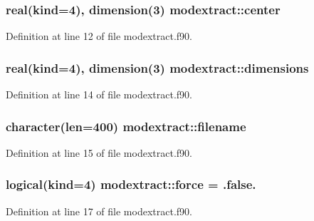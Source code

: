 \subsubsection[{\texorpdfstring{center}{center}}]{\setlength{\rightskip}{0pt plus 5cm}real(kind=4), dimension(3) modextract\+::center}\hypertarget{namespacemodextract_a58cf95edf95f11f9e6d8f589d4d93c8a}{}\label{namespacemodextract_a58cf95edf95f11f9e6d8f589d4d93c8a}


Definition at line 12 of file modextract.\+f90.

\subsubsection[{\texorpdfstring{dimensions}{dimensions}}]{\setlength{\rightskip}{0pt plus 5cm}real(kind=4), dimension(3) modextract\+::dimensions}\hypertarget{namespacemodextract_ab5bee6c90bf98302903d0eee1434ea93}{}\label{namespacemodextract_ab5bee6c90bf98302903d0eee1434ea93}


Definition at line 14 of file modextract.\+f90.

\subsubsection[{\texorpdfstring{filename}{filename}}]{\setlength{\rightskip}{0pt plus 5cm}character(len=400) modextract\+::filename}\hypertarget{namespacemodextract_ab30082cee9f7c8893bad2fc07cd9a65c}{}\label{namespacemodextract_ab30082cee9f7c8893bad2fc07cd9a65c}


Definition at line 15 of file modextract.\+f90.

\subsubsection[{\texorpdfstring{force}{force}}]{\setlength{\rightskip}{0pt plus 5cm}logical(kind=4) modextract\+::force = .false.}\hypertarget{namespacemodextract_a7b759ca92c494942296f343b61e4b2eb}{}\label{namespacemodextract_a7b759ca92c494942296f343b61e4b2eb}


Definition at line 17 of file modextract.\+f90.


